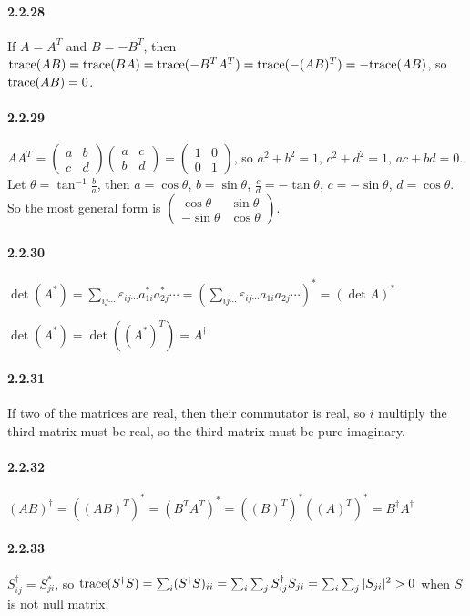 \documentclass[a4paper]{article}
\begin{document}
\paragraph{2.2.28}
If $A=A^T$ and $B=-B^T$, then $\mathrm{trace}(AB)=\mathrm{trace}(BA)=\mathrm{trace}(-B^TA^T)=\mathrm{trace}(-(AB)^T)=-\mathrm{trace}(AB)$, so $\mathrm{trace}(AB)=0$.

\paragraph{2.2.29}
\renewcommand{\arraystretch}{1}
$AA^T=\begin{pmatrix}a&b\\c&d\end{pmatrix}\begin{pmatrix}a&c\\b&d\end{pmatrix}=\begin{pmatrix}1&0\\0&1\end{pmatrix}$, so $a^2+b^2=1$, $c^2+d^2=1$, $ac+bd=0$. Let $\theta=\tan^{-1}\frac{b}{a}$, then $a=\cos\theta$, $b=\sin\theta$, $\frac{c}{d}=-\tan{\theta}$, $c=-\sin\theta$, $d=\cos\theta$. So the most general form is $\begin{pmatrix}\cos\theta&\sin\theta\\-\sin\theta&\cos\theta\end{pmatrix}$.

\paragraph{2.2.30}
$\det(A^*)=\sum_{ij\cdots}\varepsilon_{ij\cdots}a_{1i}^*a_{2j}^*\cdots=(\sum_{ij\cdots}\varepsilon_{ij\cdots}a_{1i}a_{2j}\cdots)^*=(\det A)^*$

$\det(A^*)=\det((A^*)^T)=A^\dagger$

\paragraph{2.2.31}
If two of the matrices are real, then their commutator is real, so $i$ multiply the third matrix must be real, so the third matrix must be  pure imaginary.

\paragraph{2.2.32}
$(AB)^\dagger=((AB)^T)^*=(B^TA^T)^*=((B)^T)^*((A)^T)^*=B^\dagger A^\dagger$

\paragraph{2.2.33}
$S^\dagger_{ij}=S^*_{ji}$, so 
$\mathrm{trace}(S^\dagger S)=\sum_i(S^\dagger S)_{ii}=\sum_i\sum_j S^\dagger_{ij}S_{ji}=\sum_i\sum_j|S_{ji}|^2>0$ when $S$ is not null matrix.
\end{document}
